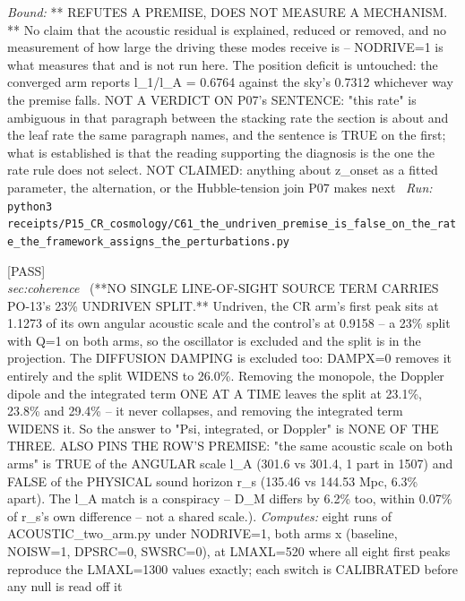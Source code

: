 \begin{description}
 \emph{Bound:} ** REFUTES A PREMISE, DOES NOT MEASURE A MECHANISM. ** No claim that the acoustic residual is explained, reduced or removed, and no measurement of how large the driving these modes receive is -- NODRIVE=1 is what measures that and is not run here. The position deficit is untouched: the converged arm reports l\_1/l\_A = 0.6764 against the sky's 0.7312 whichever way the premise falls. NOT A VERDICT ON P07's SENTENCE: "this rate" is ambiguous in that paragraph between the stacking rate the section is about and the leaf rate the same paragraph names, and the sentence is TRUE on the first; what is established is that the reading supporting the diagnosis is the one the rate rule does not select. NOT CLAIMED: anything about z\_onset as a fitted parameter, the alternation, or the Hubble-tension join P07 makes next
\ \emph{Run:} \texttt{python3 receipts/P15\_CR\_cosmology/C61\_the\_undriven\_premise\_is\_false\_on\_the\_rate\_the\_framework\_assigns\_the\_perturbations.py}
\item[\rcptlabel{C63_no_single_source_term_carries_the_undriven_split_and_the_first_probe_read_an_unwired_knob}{P15R112}\textbf{P15R112}\quad\texttt{C63\_no\_single\_source\_term\_carries\_the\_undriven\_split\_and\_the\_first\_probe\_read\_an\_unwired\_knob}]\hfill\textsf{[PASS]}\\
\textit{sec:coherence} \ (**NO SINGLE LINE-OF-SIGHT SOURCE TERM CARRIES PO-13's 23\% UNDRIVEN SPLIT.** Undriven, the CR arm's first peak sits at 1.1273 of its own angular acoustic scale and the control's at 0.9158 -- a 23\% split with Q=1 on both arms, so the oscillator is excluded and the split is in the projection. The DIFFUSION DAMPING is excluded too: DAMPX=0 removes it entirely and the split WIDENS to 26.0\%. Removing the monopole, the Doppler dipole and the integrated term ONE AT A TIME leaves the split at 23.1\%, 23.8\% and 29.4\% -- it never collapses, and removing the integrated term WIDENS it. So the answer to "Psi, integrated, or Doppler" is NONE OF THE THREE. ALSO PINS THE ROW'S PREMISE: "the same acoustic scale on both arms" is TRUE of the ANGULAR scale l\_A (301.6 vs 301.4, 1 part in 1507) and FALSE of the PHYSICAL sound horizon r\_s (135.46 vs 144.53 Mpc, 6.3\% apart). The l\_A match is a conspiracy -- D\_M differs by 6.2\% too, within 0.07\% of r\_s's own difference -- not a shared scale.). 
\emph{Computes:} eight runs of ACOUSTIC\_two\_arm.py under NODRIVE=1, both arms x (baseline, NOISW=1, DPSRC=0, SWSRC=0), at LMAXL=520 where all eight first peaks reproduce the LMAXL=1300 values exactly; each switch is CALIBRATED before any null is read off it

\end{description}
